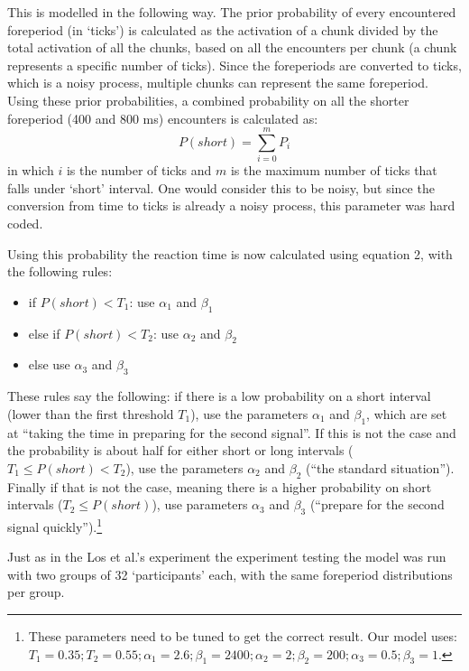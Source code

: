 \documentclass[10pt,letterpaper]{article}
\begin{document}
This is modelled in the following way. The prior probability of every encountered foreperiod (in `ticks') is calculated as the activation of a chunk divided by the total activation of all the chunks, based on all the encounters per chunk (a chunk represents a specific number of ticks). Since the foreperiods are converted to ticks, which is a noisy process, multiple chunks can represent the same foreperiod. Using these prior probabilities, a combined probability on all the shorter foreperiod (400 and 800 ms) encounters is calculated as:
\begin{equation}
	P(short) = \sum_{i = 0}^{m} P_i
\end{equation}
in which $i$ is the number of ticks and $m$ is the maximum number of ticks that falls under `short' interval. One would consider this to be noisy, but since the conversion from time to ticks is already a noisy process, this parameter was hard coded.

Using this probability the reaction time is now calculated using equation 2, with the following rules:
\begin{itemize}
	\item if $P(short) < T_1$: use $\alpha_1$ and $\beta_1$
	\item else if $P(short) < T_2$: use $\alpha_2$ and $\beta_2$
	\item else use $\alpha_3$ and $\beta_3$
\end{itemize}
These rules say the following: if there is a low probability on a short interval (lower than the first threshold $T_1$), use the parameters $\alpha_1$ and $\beta_1$, which are set at ``taking the time in preparing for the second signal''. If this is not the case and the probability is about half for either short or long intervals ($T_1 \leq P(short) < T_2$), use the parameters $\alpha_2$ and $\beta_2$ (``the standard situation''). Finally if that is not the case, meaning there is a higher probability on short intervals ($T_2 \leq P(short)$), use parameters $\alpha_3$ and $\beta_3$ (``prepare for the second signal quickly'').\footnote{These parameters need to be tuned to get the correct result. Our model uses: $T_1 = 0.35; T_2 = 0.55; \alpha_1 = 2.6; \beta_1=2400; \alpha_2 = 2; \beta_2 = 200; \alpha_3 = 0.5; \beta_3 = 1$.}
\bigskip

\noindent Just as in the Los et al.'s experiment the experiment testing the model was run with two groups of 32 `participants' each, with the same foreperiod distributions per group.
\end{document}
